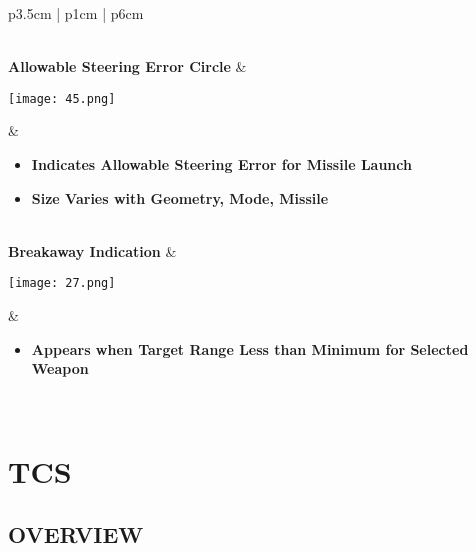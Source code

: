 \documentclass[8pt,usenames,dvipsnames,twoside]{article}
\begin{document}
\begin{center}
\begin{longtable}{p{3.5cm} | p{1cm} |  p{6cm}}
\begin{minipage}[t]{\linewidth}
\begin{itemize}
\begin{itemize}
					\end{itemize}
				\end{itemize}
			\end{minipage} \\
			\midrule
			\textbf{Allowable Steering Error Circle} &
			\begin{minipage}[t]{\linewidth}
				\vspace{-7pt}
				\centering
				\texttt{[image: 45.png]}
			\end{minipage} &
			\begin{minipage}[t]{\linewidth}
				\vspace{-7pt}
				\begin{itemize}
					\item \textbf{Indicates Allowable Steering Error for Missile Launch}
					\item \textbf{Size Varies with Geometry, Mode, Missile}
				\end{itemize}
			\end{minipage} \\
			\midrule
			\textbf{Breakaway Indication} &
			\begin{minipage}[t]{\linewidth}
				\vspace{-7pt}
				\centering
				\texttt{[image: 27.png]}
			\end{minipage} &
			\begin{minipage}[t]{\linewidth}
				\vspace{-7pt}
				\begin{itemize}
					\item \textbf{Appears when Target Range Less than Minimum for Selected Weapon}
				\end{itemize}
			\end{minipage} \\
			\bottomrule
		\end{longtable}
	\end{center}

	\cleardoublepage

	\section{TCS}

	\subsection{OVERVIEW}

	\cleardoublepage
\end{document}
